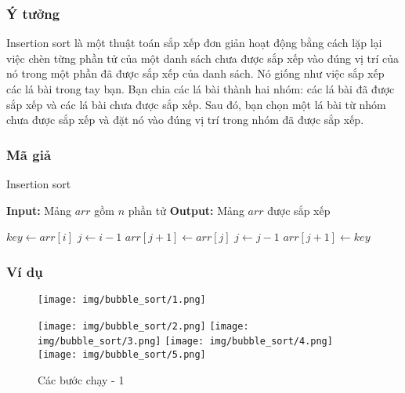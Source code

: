 \subsubsection{Ý tưởng}
Insertion sort là một thuật toán sắp xếp đơn giản hoạt động bằng cách lặp lại việc chèn từng phần tử của một danh sách chưa được sắp xếp vào đúng vị trí của nó trong một phần đã được sắp xếp của danh sách. Nó giống như việc sắp xếp các lá bài trong tay bạn. Bạn chia các lá bài thành hai nhóm: các lá bài đã được sắp xếp và các lá bài chưa được sắp xếp. Sau đó, bạn chọn một lá bài từ nhóm chưa được sắp xếp và đặt nó vào đúng vị trí trong nhóm đã được sắp xếp.
\subsubsection{Mã giả}

\begin{algorithm}[H]
\caption{Insertion sort}
\begin{algorithmic}[1]
    \State \textbf{Input:} Mảng $arr$ gồm $n$ phần tử
    \State \textbf{Output:} Mảng $arr$ được sắp xếp
    
    \State $key \gets arr[i]$
    \State $j \gets i - 1$
        \State $arr[j+1] \gets arr[j]$
        \State $j \gets j - 1$
    \EndWhile
    \State $arr[j+1] \gets key$
\EndFor
\EndProcedure
\end{algorithmic}
\end{algorithm}

\subsubsection{Ví dụ}

\begin{figure}[H]
    \centering
    \texttt{[image: img/bubble\_sort/1.png]}
    
    \vspace{0.5cm}
    \texttt{[image: img/bubble\_sort/2.png]}
    \vspace{0.5cm}
    \texttt{[image: img/bubble\_sort/3.png]}
    \vspace{0.5cm}
    \texttt{[image: img/bubble\_sort/4.png]}
    \vspace{0.5cm}
    \texttt{[image: img/bubble\_sort/5.png]}
    \caption{Các bước chạy - 1}
    \label{fig:part1}
\end{figure}

